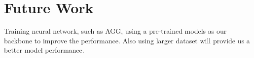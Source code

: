 \section{Future Work}
Training neural network, such as AGG, using a pre-trained models as our backbone to improve the performance. Also using larger dataset will provide us a better model performance.